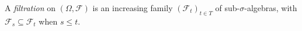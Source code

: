 
A \emph{filtration} on $(\Omega,\mathcal F)$ is an increasing family $(\mathcal F_t)_{t\in T}$ of sub-$\sigma$-algebras, with $\mathcal F_s\subseteq\mathcal F_t$ when $s\le t$.
